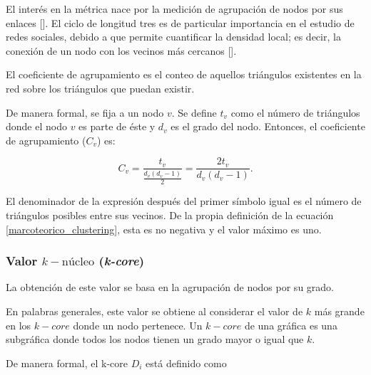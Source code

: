 \documentclass[../main.tex]{subfiles}
\begin{document}
 El interés en la métrica nace por la medición de agrupación de nodos por sus enlaces [\cite{newman2018networks}]. El ciclo de longitud tres es de particular importancia  en el estudio de redes sociales, debido a que permite cuantificar la densidad local; es decir, la conexión de un nodo con los vecinos más cercanos  [\cite{kadushin2012understanding}].
 

 
 
 
 
 El coeficiente de agrupamiento es el conteo de aquellos triángulos existentes en la red sobre los triángulos que puedan existir. 
 
 

De manera formal, se fija a un nodo $v$. Se define $t_{v}$ como el número de triángulos donde el nodo $v$ es parte de éste y $d_{v}$ es el grado del nodo. Entonces, el coeficiente de agrupamiento ($C_{v}$) es: 

\begin{equation}
    \label{marcoteorico_clustering}
    C_{v} = \frac{ t_{v} }{ \frac{d_{v} (d_{v} - 1 )}{ 2 }} = \frac{2 t_{v} }{d_{v} (d_{v} - 1 ) }.
\end{equation}

El denominador de la expresión después del primer símbolo igual es el número de triángulos posibles entre sus vecinos. De la propia definición de la ecuación \ref{marcoteorico_clustering}, esta es no negativa y el valor máximo es uno. 


\subsubsection{Valor $k-\text{núcleo}$ (\textit{k-core}) }

La obtención de este valor se basa en la agrupación de nodos por su grado.

En palabras generales, este valor se obtiene al considerar el valor de $k$ más grande en los \textit{$k-core$} 
donde un nodo pertenece. Un $k-core$ de una gráfica es una subgráfica donde todos los nodos tienen un grado mayor o igual que  $k$.

De manera formal, el k-core $D_i$ está definido como 
\end{document}
